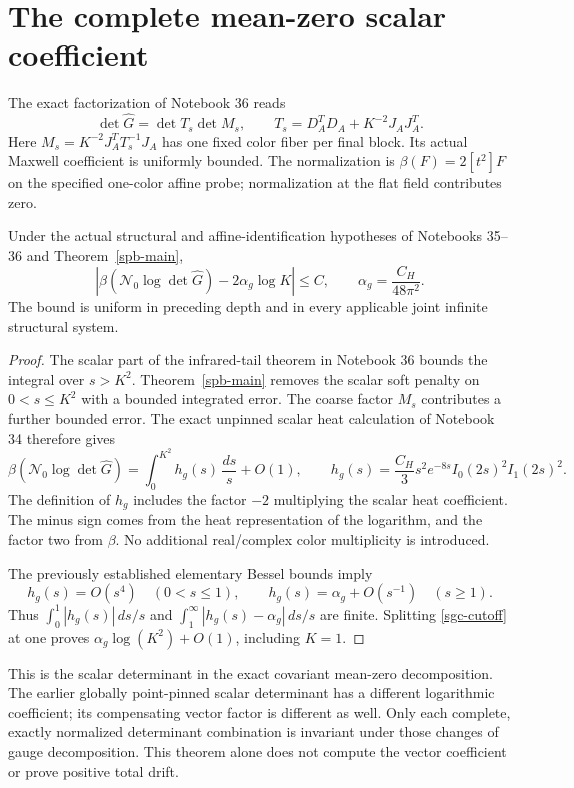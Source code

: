 \section{The complete mean-zero scalar coefficient}
\label{sgc-section}

The exact factorization of Notebook 36 reads
\[
 \det\widehat G=\det T_s\det M_s,\qquad
 T_s=D_A^TD_A+K^{-2}J_AJ_A^T.
\]
Here \(M_s=K^{-2}J_A^TT_s^{-1}J_A\) has one fixed color
fiber per final block. Its actual Maxwell coefficient is uniformly
bounded. The normalization is
\(\beta(F)=2[t^2]F\) on the specified one-color affine probe;
normalization at the flat field contributes zero.

\begin{theorem}
\label{sgc-main}
Under the actual structural and affine-identification hypotheses of
Notebooks 35--36 and Theorem~\ref{spb-main},
\begin{equation}
 \left|\beta(\mathcal N_0\log\det\widehat G)
                 -2\alpha_g\log K\right|\le C,
 \qquad \alpha_g=\frac{C_H}{48\pi^2}.
 \label{sgc-coefficient}
\end{equation}
The bound is uniform in preceding depth and in every applicable
joint infinite structural system.
\end{theorem}

\begin{proof}
The scalar part of the infrared-tail theorem in Notebook 36 bounds
the integral over \(s>K^2\). Theorem~\ref{spb-main} removes the scalar
soft penalty on \(0<s\le K^2\) with a bounded integrated error.
The coarse factor \(M_s\) contributes a further bounded error.
The exact unpinned scalar heat calculation of Notebook 34 therefore
gives
\begin{equation}
 \beta(\mathcal N_0\log\det\widehat G)
       =\int_0^{K^2}h_g(s)\,\frac{ds}{s}+O(1),
 \qquad
 h_g(s)=\frac{C_H}{3}s^2e^{-8s}I_0(2s)^2I_1(2s)^2.
 \label{sgc-cutoff}
\end{equation}
The definition of \(h_g\) includes the factor \(-2\) multiplying
the scalar heat coefficient. The minus sign comes from the heat
representation of the logarithm, and the factor two from \(\beta\).
No additional real/complex color multiplicity is introduced.

The previously established elementary Bessel bounds imply
\[
 h_g(s)=O(s^4)\quad(0<s\le1),\qquad
 h_g(s)=\alpha_g+O(s^{-1})\quad(s\ge1).
 \]
Thus \(\int_0^1|h_g(s)|\,ds/s\) and
\(\int_1^\infty|h_g(s)-\alpha_g|\,ds/s\) are finite.
Splitting \eqref{sgc-cutoff} at one proves
\(\alpha_g\log(K^2)+O(1)\), including \(K=1\).
\end{proof}

This is the scalar determinant in the exact covariant mean-zero
decomposition. The earlier globally point-pinned scalar determinant
has a different logarithmic coefficient; its compensating vector
factor is different as well. Only each complete, exactly normalized
determinant combination is invariant under those changes of gauge
decomposition. This theorem alone does not compute the vector
coefficient or prove positive total drift.
